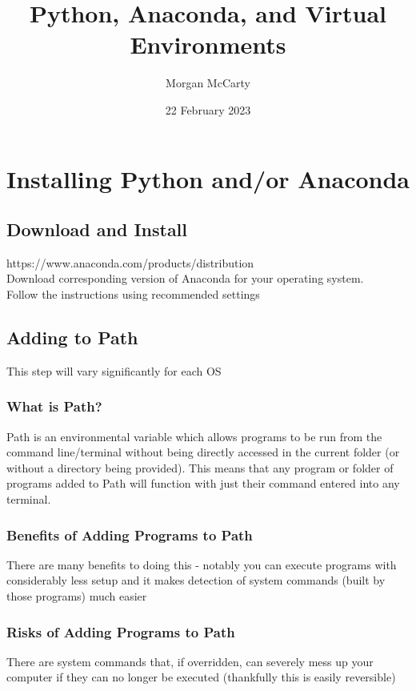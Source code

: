 \documentclass{article}
\title{Python, Anaconda, and Virtual Environments}
\author{Morgan McCarty}
\date{22 February 2023}
\begin{document}
    \maketitle

    \section{Installing Python and/or Anaconda}

        \subsection{Download and Install}
            https://www.anaconda.com/products/distribution \\Download corresponding version of Anaconda for your operating system.
            \\Follow the instructions using recommended settings

        \subsection{Adding to Path}
            This step will vary significantly for each OS

            \subsubsection{What is Path?}
                Path is an environmental variable which allows programs to be run from the command line/terminal without being directly accessed in the current folder (or without a directory being provided).
                This means that any program or folder of programs added to Path will function with just their command entered into any terminal.
            
            \subsubsection{Benefits of Adding Programs to Path}
            There are many benefits to doing this - notably you can execute programs with considerably less setup and it makes detection of system commands (built by those programs) much easier

            \subsubsection{Risks of Adding Programs to Path}
            There are system commands that, if overridden, can severely mess up your computer if they can no longer be executed (thankfully this is easily reversible)
\end{document}
